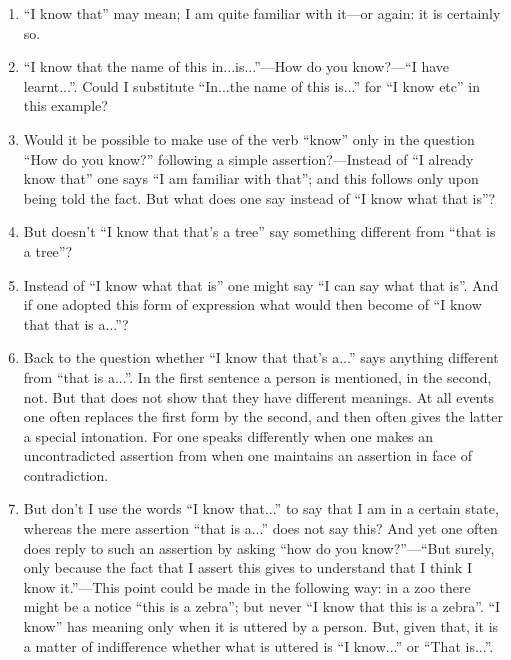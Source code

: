\documentclass{book}
\begin{document}
\begin{enumerate}
\item
``I know that'' may mean; I am quite familiar with it---or again: it is
certainly so.

\item
``I know that the name of this in...is...''---How do you know?---``I have
learnt...''.  Could I substitute ``In...the name of this is...'' for ``I know
etc'' in this example?

\item
Would it be possible to make use of the verb ``know'' only in the question
``How do you know?'' following a simple assertion?---Instead of ``I already
know that'' one says ``I am familiar with that''; and this follows only upon
being told the fact. But what does one say instead of ``I know what that is''?

\item
But doesn't ``I know that that's a tree'' say something different from ``that
is a tree''?

\item
Instead of ``I know what that is'' one might say ``I can say what that is''.
And if one adopted this form of expression what would then become of ``I know
that that is a...''?

\item
Back to the question whether ``I know that that's a...'' says anything
different from ``that is a...''. In the first sentence a person is mentioned,
in the second, not. But that does not show that they have different meanings.
At all events one often replaces the first form by the second, and then often
gives the latter a special intonation. For one speaks differently when one
makes an uncontradicted assertion from when one maintains an assertion in face
of contradiction.

\item
But don't I use the words ``I know that...'' to say that I am in a certain
state, whereas the mere assertion ``that is a...'' does not say this? And yet
one often does reply to such an assertion by asking ``how do you
know?''---``But surely, only because the fact that I assert this gives to
understand that I think I know it.''---This point could be made in the
following way: in a zoo there might be a notice ``this is a zebra''; but never
``I know that this is a zebra''.  ``I know'' has meaning only when it is
uttered by a person. But, given that, it is a matter of indifference whether
what is uttered is ``I know...'' or ``That is...''.


\end{enumerate}
\end{document}
